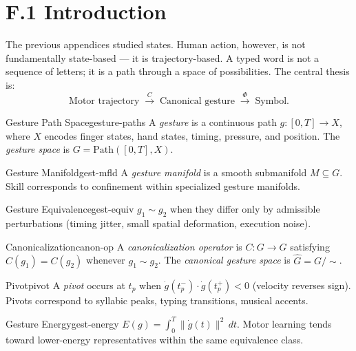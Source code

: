 
\section*{F.1 Introduction}

The previous appendices studied states. Human action, however, is not
fundamentally state-based — it is trajectory-based. A typed word is not
a sequence of letters; it is a path through a space of possibilities.
The central thesis is:
\[
  \text{Motor trajectory}
  \;\xrightarrow{C}\;
  \text{Canonical gesture}
  \;\xrightarrow{\Phi}\;
  \text{Symbol.}
\]

\begin{definition}{Gesture Path Space}{gesture-paths}
  A \emph{gesture} is a continuous path $g : [0,T] \to X$, where $X$
  encodes finger states, hand states, timing, pressure, and position.
  The \emph{gesture space} is $G = \mathrm{Path}([0,T], X)$.
\end{definition}

\begin{definition}{Gesture Manifold}{gest-mfld}
  A \emph{gesture manifold} is a smooth submanifold $M \subseteq G$.
  Skill corresponds to confinement within specialized gesture manifolds.
\end{definition}

\begin{definition}{Gesture Equivalence}{gest-equiv}
  $g_1 \sim g_2$ when they differ only by admissible perturbations
  (timing jitter, small spatial deformation, execution noise).
\end{definition}

\begin{definition}{Canonicalization}{canon-op}
  A \emph{canonicalization operator} is $C : G \to \hat{G}$ satisfying
  $C(g_1) = C(g_2)$ whenever $g_1 \sim g_2$.
  The \emph{canonical gesture space} is $\hat{G} = G/{\sim}$.
\end{definition}

\begin{definition}{Pivot}{pivot}
  A \emph{pivot} occurs at $t_p$ when
  $\dot{g}(t_p^-) \cdot \dot{g}(t_p^+) < 0$ (velocity reverses sign).
  Pivots correspond to syllabic peaks, typing transitions, musical accents.
\end{definition}

\begin{definition}{Gesture Energy}{gest-energy}
  $E(g) = \int_0^T \|\dot{g}(t)\|^2\,dt$.
  Motor learning tends toward lower-energy representatives within
  the same equivalence class.
\end{definition}

